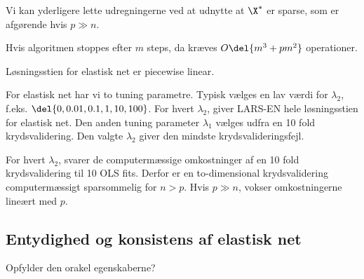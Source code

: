 Vi kan yderligere lette udregningerne ved at udnytte at \(\X^*\) er sparse, som er afgørende hvis \(p \gg n\).

Hvis algoritmen stoppes efter \(m\) steps, da kræves \(O \del{m^3 + pm^2}\) operationer.

Løsningsstien for elastisk net er piecewise linear.

For elastisk net har vi to tuning parametre. 
Typisk vælges en lav værdi for \(\lambda_2\), f.eks. \(\del{0,0.01,0.1,1,10,100}\).
For hvert \(\lambda_2\), giver LARS-EN hele løsningsstien for elastisk net.
Den anden tuning parameter \(\lambda_1\) vælges udfra en 10 fold krydsvalidering.
Den valgte \(\lambda_2\) giver den mindste krydsvalideringsfejl.

For hvert \(\lambda_2\), svarer de computermæssige omkostninger af en 10 fold krydsvalidering til 10 OLS fits.
Derfor er en to-dimensional krydsvalidering computermæssigt sparsommelig for \(n > p\).
Hvis \(p \gg n\), vokser omkostningerne lineært med \(p\).
%
\subsection{Entydighed og konsistens af elastisk net}
Opfylder den orakel egenskaberne?
\newpage
